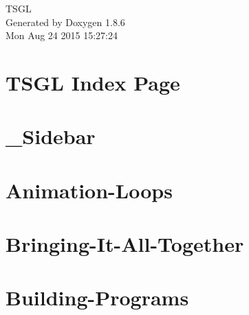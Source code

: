 \documentclass[twoside]{book}
\newcommand{\clearemptydoublepage}{%
  \newpage{\pagestyle{empty}\cleardoublepage}%
}
\begin{document}
\hypersetup{pageanchor=false}
\begin{titlepage}
\vspace*{7cm}
\begin{center}%
{\Large T\-S\-G\-L }\\
\vspace*{1cm}
{\large Generated by Doxygen 1.8.6}\\
\vspace*{0.5cm}
{\small Mon Aug 24 2015 15:27:24}\\
\end{center}
\end{titlepage}
\clearemptydoublepage
\tableofcontents
\clearemptydoublepage
{}
\hypersetup{pageanchor=true}

\chapter{T\-S\-G\-L Index Page}
\label{index}\hypertarget{index}{}
\chapter{\-\_\-\-Sidebar}
\label{md__home_cpd5_workspace__t_s_g_l_docs-wiki___sidebar}
\hypertarget{md__home_cpd5_workspace__t_s_g_l_docs-wiki___sidebar}{}

\chapter{Animation-\/\-Loops}
\label{md__home_cpd5_workspace__t_s_g_l_docs-wiki__animation-_loops}
\hypertarget{md__home_cpd5_workspace__t_s_g_l_docs-wiki__animation-_loops}{}

\chapter{Bringing-\/\-It-\/\-All-\/\-Together}
\label{md__home_cpd5_workspace__t_s_g_l_docs-wiki__bringing-_it-_all-_together}
\hypertarget{md__home_cpd5_workspace__t_s_g_l_docs-wiki__bringing-_it-_all-_together}{}

\chapter{Building-\/\-Programs}
\label{md__home_cpd5_workspace__t_s_g_l_docs-wiki__building-_programs}
\hypertarget{md__home_cpd5_workspace__t_s_g_l_docs-wiki__building-_programs}{}

\end{document}
